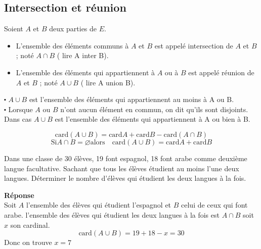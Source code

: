 \subsection*{Intersection et réunion}
Soient $A $ et $ B $ deux parties de  $E. $
\begin{itemize}
\item[\textbullet] L'ensemble des éléments communs à  $A $ et $ B $ est appelé intersection de $A $ et $ B $ ; noté $ A\cap B $  ( lire A inter B).
\item[\textbullet] L'ensemble des éléments qui appartiennent  à  $A $ ou à $ B $ est appelé réunion de $A $ et $ B $ ; noté $ A\cup  B $  ( lire A union B).
\end{itemize}


\begin{remark}
$ \centerdot $ $A\cup B$ est l'ensemble des éléments qui appartiennent  au moins à A ou B.\\
$ \centerdot $ Lorsque $ A$ ou  $ B$ n'ont aucun élément en commun, on dit qu'ils sont disjoints. Dans cas  $A\cup B$  est l'ensemble des éléments qui appartiennent à A ou bien à B.
\end{remark}
\begin{theorem}
                 \[\textrm{card}(A\cup B)= \textrm{card}A  + \textrm{card}B- \textrm{card}(A\cap B) \]
                  \[ \textrm{Si}  A\cap B=\varnothing  \textrm{alors}\quad \textrm{card}(A\cup B)= \textrm{card}A  + \textrm{card}B   \]
\end{theorem}
\begin{exercice}
Dans une classe de 30 élèves, 19 font espagnol, 18 font arabe comme deuxième langue facultative. Sachant que tous les élèves étudient au moins l'une  deux  langues. Déterminer le nombre d'élèves qui étudient les deux langues à la fois.
\end{exercice}
\textbf{Réponse}\\
Soit $ A $ l'ensemble des élèves qui étudient l'espagnol et $ B $ celui de ceux qui font arabe. l'ensemble des élèves qui étudient les deux langues à la fois est $A\cap B  $ soit $ x $ son cardinal. 
\[\textrm{card}(A\cup B)= 19+18-x=30  \]Donc on trouve $ x=7 $
